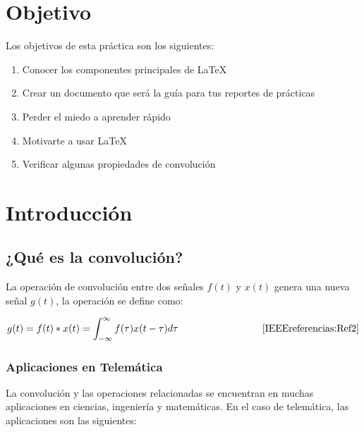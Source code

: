 \documentclass[10pt]{article}
\begin{document}
\section{Objetivo}
Los objetivos de esta práctica son los siguientes:
\begin{enumerate}
    \item Conocer los componentes principales de \LaTeX
    \item Crear un documento que será la guía para tus reportes de prácticas
    \item Perder el miedo a aprender rápido
    \item Motivarte a usar \LaTeX
    \item Verificar algunas propiedades de convolución
\end{enumerate}


\newpage
\section{Introducción}
\subsection{¿Qué es la convolución?}
La operación de convolución entre dos señales \textbf{$f(t)$} y \textbf{$x(t)$} genera una nueva señal \textbf{$g(t)$}, la operación se define como:

\begin{equation*}
		g(t) = f(t)*x(t) = \int_{-\infty}^{\infty} f(\tau)x(t-\tau)d\tau \hspace{3cm} \cite{IEEEreferencias:Ref2}
\end{equation*}


\subsubsection{Aplicaciones en Telemática}
La convolución y las operaciones relacionadas se encuentran en muchas aplicaciones en ciencias, ingeniería y matemáticas. En el caso de telemática, las aplicaciones son las siguientes:
\end{document}

